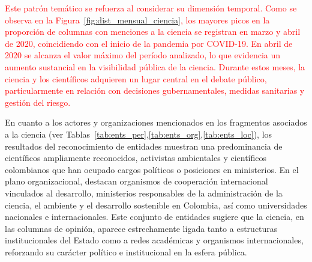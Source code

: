 \documentclass[11pt,a4paper]{article}
\begin{document}
\textcolor{red}{Este patrón temático se refuerza al considerar su dimensión temporal. Como se observa en la Figura~\ref{fig:dist_mensual_ciencia}, los mayores picos en la proporción de columnas con menciones a la ciencia se registran en marzo y abril de 2020, coincidiendo con el inicio de la pandemia por COVID-19. En abril de 2020 se alcanza el valor máximo del período analizado, lo que evidencia un aumento sustancial en la visibilidad pública de la ciencia. Durante estos meses, la ciencia y los científicos adquieren un lugar central en el debate público, particularmente en relación con decisiones gubernamentales, medidas sanitarias y gestión del riesgo.} 




En cuanto a los actores y organizaciones mencionados en los fragmentos asociados a la ciencia (ver Tablas~\ref{tab:ents_per},\ref{tab:ents_org},\ref{tab:ents_loc}), los resultados del reconocimiento de entidades muestran una predominancia de científicos ampliamente reconocidos, activistas ambientales y científicos colombianos que han ocupado cargos políticos o posiciones en ministerios. En el plano organizacional, destacan organismos de cooperación internacional vinculados al desarrollo, ministerios responsables de la administración de la ciencia, el ambiente y el desarrollo sostenible en Colombia, así como universidades nacionales e internacionales. Este conjunto de entidades sugiere que la ciencia, en las columnas de opinión, aparece estrechamente ligada tanto a estructuras institucionales del Estado como a redes académicas y organismos internacionales, reforzando su carácter político e institucional en la esfera pública.

\end{document}
